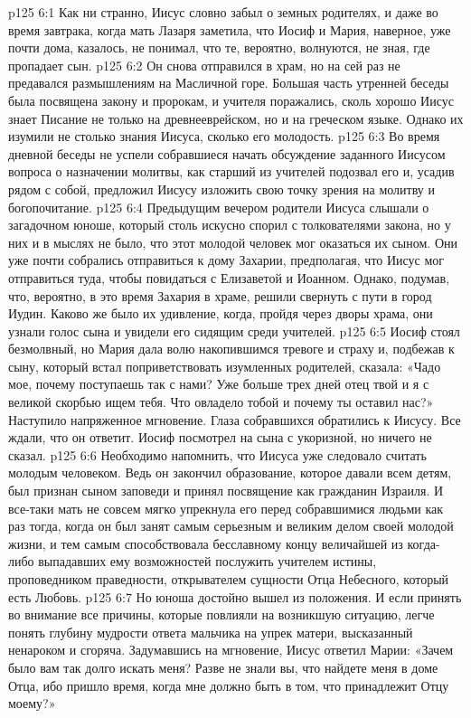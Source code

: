 \vs p125 6:1 Как ни странно, Иисус словно забыл о земных родителях, и даже во время завтрака, когда мать Лазаря заметила, что Иосиф и Мария, наверное, уже почти дома, казалось, не понимал, что те, вероятно, волнуются, не зная, где пропадает сын.
\vs p125 6:2 Он снова отправился в храм, но на сей раз не предавался размышлениям на Масличной горе. Большая часть утренней беседы была посвящена закону и пророкам, и учителя поражались, сколь хорошо Иисус знает Писание не только на древнееврейском, но и на греческом языке. Однако их изумили не столько знания Иисуса, сколько его молодость.
\vs p125 6:3 Во время дневной беседы не успели собравшиеся начать обсуждение заданного Иисусом вопроса о назначении молитвы, как старший из учителей подозвал его и, усадив рядом с собой, предложил Иисусу изложить свою точку зрения на молитву и богопочитание.
\vs p125 6:4 \pc Предыдущим вечером родители Иисуса слышали о загадочном юноше, который столь искусно спорил с толкователями закона, но у них и в мыслях не было, что этот молодой человек мог оказаться их сыном. Они уже почти собрались отправиться к дому Захарии, предполагая, что Иисус мог отправиться туда, чтобы повидаться с Елизаветой и Иоанном. Однако, подумав, что, вероятно, в это время Захария в храме, решили свернуть с пути в город Иудин. Каково же было их удивление, когда, пройдя через дворы храма, они узнали голос сына и увидели его сидящим среди учителей.
\vs p125 6:5 Иосиф стоял безмолвный, но Мария дала волю накопившимся тревоге и страху и, подбежав к сыну, который встал поприветствовать изумленных родителей, сказала: «Чадо мое, почему поступаешь так с нами? Уже больше трех дней отец твой и я с великой скорбью ищем тебя. Что овладело тобой и почему ты оставил нас?» Наступило напряженное мгновение. Глаза собравшихся обратились к Иисусу. Все ждали, что он ответит. Иосиф посмотрел на сына с укоризной, но ничего не сказал.
\vs p125 6:6 \pc Необходимо напомнить, что Иисуса уже следовало считать молодым человеком. Ведь он закончил образование, которое давали всем детям, был признан сыном заповеди и принял посвящение как гражданин Израиля. И все\hyp{}таки мать не совсем мягко упрекнула его перед собравшимися людьми как раз тогда, когда он был занят самым серьезным и великим делом своей молодой жизни, и тем самым способствовала бесславному концу величайшей из когда\hyp{}либо выпадавших ему возможностей послужить учителем истины, проповедником праведности, открывателем сущности Отца Небесного, который есть Любовь.
\vs p125 6:7 Но юноша достойно вышел из положения. И если принять во внимание все причины, которые повлияли на возникшую ситуацию, легче понять глубину мудрости ответа мальчика на упрек матери, высказанный ненароком и сгоряча. Задумавшись на мгновение, Иисус ответил Марии: «Зачем было вам так долго искать меня? Разве не знали вы, что найдете меня в доме Отца, ибо пришло время, когда мне должно быть в том, что принадлежит Отцу моему?»
